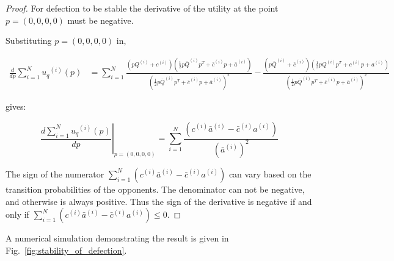 \documentclass[10pt]{article}
\begin{document}
\begin{proof}
    For defection to be stable the derivative of the utility
    at the point \(p = (0, 0, 0, 0)\) must be negative.

    Substituting \(p = (0, 0, 0, 0)\) in,

    \begin{align}\label{eq:mo_tournament_derivative}
        \frac{d}{dp} \sum\limits_{i=1} ^ {N} {u_q}^{(i)} (p) & = \displaystyle\sum\limits_{i=1} ^ {N}
        \frac{\left(pQ^{(i)} + c^{(i)}\right) \left(\frac{1}{2} p\bar{Q}^{(i)} p^T + \bar{c}^{(i)} p + \bar{a}^ {(i)}\right)}
        {\left(\frac{1}{2} p\bar{Q}^{(i)} p^T + \bar{c}^{(i)} p + \bar{a}^ {(i)}\right)^ 2}
        - \frac{\left(p\bar{Q}^{(i)} + \bar{c}^{(i)}\right) \left(\frac{1}{2} pQ^{(i)} p^T + c^{(i)} p + a^ {(i)}\right)}
        {\left(\frac{1}{2} p\bar{Q}^{(i)} p^T + \bar{c}^{(i)} p + \bar{a}^ {(i)}\right)^ 2}
    \end{align}

    gives:

    \begin{equation}
        \left.\frac{d\sum\limits_{i=1} ^ {N} {u_q}^{(i)} (p)}{dp} \right\rvert_{p=(0,0,0,0)} =
    \sum_{i=1} ^ N \frac{(c^{(i)} \bar{a}^{(i)} - \bar{c}^{(i)} a^{(i)})}
    {(\bar{a}^{(i)})^2}
    \end{equation}

    The sign of the numerator \( \displaystyle\sum_{i=1} ^ N (c^{(i)} \bar{a}^{(i)} - \bar{c}^{(i)} a^{(i)})\)
    can vary based on the transition probabilities of the opponents.
    The denominator can not be negative, and otherwise is always positive.
    Thus the sign of the derivative is negative if and only if
    \( \displaystyle\sum_{i=1} ^ N (c^{(i)} \bar{a}^{(i)} - \bar{c}^{(i)} a^{(i)}) \leq 0\).
\end{proof}

A numerical simulation demonstrating the result is given in Fig.~\ref{fig:stability_of_defection}.
\end{document}
